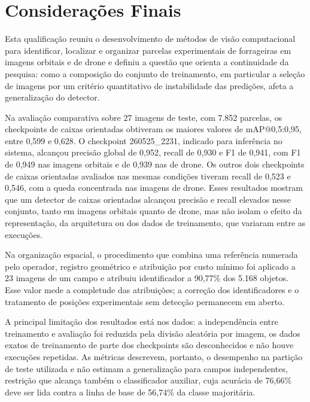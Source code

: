 \chapter{Considera\c{c}\~oes Finais}
\label{cap:consideracoes-finais}

Esta qualifica\c{c}\~ao reuniu o desenvolvimento de m\'etodos de vis\~ao computacional para identificar, localizar e organizar parcelas experimentais de forrageiras em imagens orbitais e de drone e definiu a quest\~ao que orienta a continuidade da pesquisa: como a composi\c{c}\~ao do conjunto de treinamento, em particular a sele\c{c}\~ao de imagens por um crit\'erio quantitativo de instabilidade das predi\c{c}\~oes, afeta a generaliza\c{c}\~ao do detector.

Na avalia\c{c}\~ao comparativa sobre 27 imagens de teste, com 7.852 parcelas, os checkpoints de caixas orientadas obtiveram os maiores valores de mAP@0,5:0,95, entre 0,599 e 0,628. O checkpoint 260525\_2231, indicado para infer\^encia no sistema, alcan\c{c}ou precis\~ao global de 0,952, recall de 0,930 e F1 de 0,941, com F1 de 0,949 nas imagens orbitais e de 0,939 nas de drone. Os outros dois checkpoints de caixas orientadas avaliados nas mesmas condi\c{c}\~oes tiveram recall de 0,523 e 0,546, com a queda concentrada nas imagens de drone. Esses resultados mostram que um detector de caixas orientadas alcan\c{c}ou precis\~ao e recall elevados nesse conjunto, tanto em imagens orbitais quanto de drone, mas n\~ao isolam o efeito da representa\c{c}\~ao, da arquitetura ou dos dados de treinamento, que variaram entre as execu\c{c}\~oes.

Na organiza\c{c}\~ao espacial, o procedimento que combina uma refer\^encia numerada pelo operador, registro geom\'etrico e atribui\c{c}\~ao por custo m\'inimo foi aplicado a 23 imagens de um campo e atribuiu identificador a 90,77\% dos 5.168 objetos. Esse valor mede a completude das atribui\c{c}\~oes; a corre\c{c}\~ao dos identificadores e o tratamento de posi\c{c}\~oes experimentais sem detec\c{c}\~ao permanecem em aberto.

A principal limita\c{c}\~ao dos resultados est\'a nos dados: a independ\^encia entre treinamento e avalia\c{c}\~ao foi reduzida pela divis\~ao aleat\'oria por imagem, os dados exatos de treinamento de parte dos checkpoints s\~ao desconhecidos e n\~ao houve execu\c{c}\~oes repetidas. As m\'etricas descrevem, portanto, o desempenho na parti\c{c}\~ao de teste utilizada e n\~ao estimam a generaliza\c{c}\~ao para campos independentes, restri\c{c}\~ao que alcan\c{c}a tamb\'em o classificador auxiliar, cuja acur\'acia de 76,66\% deve ser lida contra a linha de base de 56,74\% da classe majorit\'aria.

